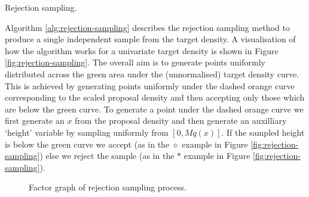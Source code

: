 \begin{algorithm}[!t]
\caption{Rejection sampling.}
\label{alg:rejection-sampling}

\end{algorithm}

Algorithm \ref{alg:rejection-sampling} describes the rejection sampling method to produce a single independent sample from the target density. A visualisation of how the algorithm works for a univariate target density is shown in Figure \ref{fig:rejection-sampling}. The overall aim is to generate points uniformly distributed across the green area under the (unnormalised) target density curve. This is achieved by generating points uniformly under the dashed orange curve corresponding to the scaled proposal density and then accepting only those which are below the green curve. To generate a point under the dashed orange curve we first generate an $x$ from the proposal density and then generate an auxilliary `height' variable by sampling uniformly from $[0, Mq(x)]$. If the sampled height is below the green curve we accept (as in the $\diamond$ example in Figure \ref{fig:rejection-sampling}) else we reject the sample (as in the $*$ example in Figure \ref{fig:rejection-sampling}).

\begin{figure}[t]
\centering
{}
\caption{Factor graph of rejection sampling process.}
\label{fig:rejection-sampling-factor-graph}
\end{figure}

